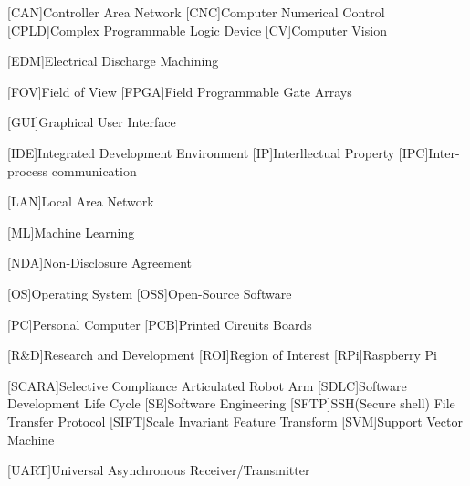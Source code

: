 \begin{acronym}
	[CAN]{Controller Area Network}
	[CNC]{Computer Numerical Control}
	[CPLD]{Complex Programmable Logic Device}
	[CV]{Computer Vision}
	
	[EDM]{Electrical Discharge Machining}
	
	[FOV]{Field of View}
	[FPGA]{Field Programmable Gate Arrays}
	
	[GUI]{Graphical User Interface}
	
	[IDE]{Integrated Development Environment}
	[IP]{Interllectual Property}
	[IPC]{Inter-process communication}
	
	[LAN]{Local Area Network}
	
	[ML]{Machine Learning}
	
	[NDA]{Non-Disclosure Agreement}
	
	[OS]{Operating System}
	[OSS]{Open-Source Software}
	
	[PC]{Personal Computer}
	[PCB]{Printed Circuits Boards}
	
	[R\&D]{Research and Development}
	[ROI]{Region of Interest}
	[RPi]{Raspberry Pi}
			
	[SCARA]{Selective Compliance Articulated Robot Arm}
	[SDLC]{Software Development Life Cycle}
	[SE]{Software Engineering}
	[SFTP]{SSH(Secure shell) File Transfer Protocol}
	[SIFT]{Scale Invariant Feature Transform}
	[SVM]{Support Vector Machine}
	
	[UART]{Universal Asynchronous Receiver/Transmitter}
\end{acronym}

